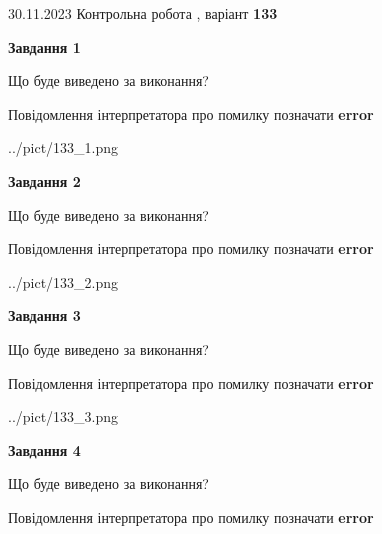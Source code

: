 \documentclass[12pt, ukrainian]{article}
\begin{document}
{{30.11.2023 Контрольна робота , варіант  \No \textbf { 133 }\par}}
{




{\begin {center}\textbf{Завдання 1}\end {center}}\par
Що буде виведено за виконання? \par
Повідомлення інтерпретатора про помилку позначати \textbf{error}

\begin{center}
	{../pict/133_1.png}
\end{center}
\newpage

{\begin {center}\textbf{Завдання 2}\end {center}}\par
Що буде виведено за виконання? \par
Повідомлення інтерпретатора про помилку позначати \textbf{error}

\begin{center}
	{../pict/133_2.png}
\end{center}
\newpage

{\begin {center}\textbf{Завдання 3}\end {center}}\par
Що буде виведено за виконання? \par
Повідомлення інтерпретатора про помилку позначати \textbf{error}

\begin{center}
	{../pict/133_3.png}
\end{center}
\newpage

{\begin {center}\textbf{Завдання 4}\end {center}}\par
Що буде виведено за виконання? \par
Повідомлення інтерпретатора про помилку позначати \textbf{error}

}
\end{document}
